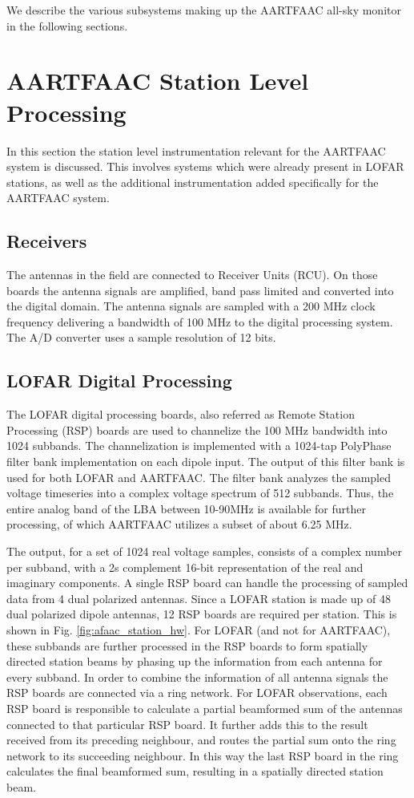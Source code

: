 \documentclass{ws-jai}
\begin{document}
We describe the various subsystems making up the AARTFAAC all-sky monitor in the
following sections.

\section {\label{sec:station_hardware} AARTFAAC Station Level Processing}
In  this section  the station  level instrumentation  relevant for  the AARTFAAC
system is discussed.  This involves systems which were already  present in LOFAR
stations, as well  as the additional instrumentation added  specifically for the
AARTFAAC system.
\subsection {Receivers}  The  antennas  in the  field  are connected  to
Receiver Units  (RCU). On those boards  the antenna signals are  amplified, band
pass limited  and converted into  the digital  domain.  The antenna  signals are
sampled with a 200 MHz clock frequency  delivering a bandwidth of 100 MHz to the
digital processing  system. The  A/D converter  uses a  sample resolution  of 12
bits.

\subsection  {LOFAR Digital  Processing}  The  LOFAR digital  processing
boards, also  referred as  Remote Station  Processing (RSP)  boards are  used to
channelize  the 100  MHz bandwidth  into 1024  subbands.  The  channelization is
implemented with a 1024-tap PolyPhase  filter bank implementation on each dipole
input. The output of  this filter bank is used for both  LOFAR and AARTFAAC. The
filter  bank analyzes  the sampled  voltage  timeseries into  a complex  voltage
spectrum  of 512  subbands. Thus,  the  entire analog  band of  the LBA  between
10-90MHz  is available  for further  processing,  of which  AARTFAAC utilizes  a
subset of about 6.25 MHz.

The output, for a set of 1024 real voltage samples, consists of a complex number
per  subband,  with a  2s  complement  16-bit  representation  of the  real  and
imaginary components.  A  single RSP board can handle the  processing of sampled
data from 4 dual polarized antennas. Since a LOFAR station is made up of 48 dual
polarized dipole antennas, 12 RSP boards are required per station. This is shown
in Fig.   \ref{fig:afaac_station_hw}.  For LOFAR  (and not for  AARTFAAC), these
subbands are  further processed  in the  RSP boards  to form  spatially directed
station  beams  by phasing  up  the  information  from  each antenna  for  every
subband. In  order to  combine the  information of all  antenna signals  the RSP
boards are connected via a ring  network. For LOFAR observations, each RSP board
is responsible to  calculate a partial beamformed sum of  the antennas connected
to that particular RSP board.  It further  adds this to the result received from
its preceding neighbour, and routes the partial sum onto the ring network to its
succeeding neighbour.  In this way the last RSP board in the ring calculates the
final beamformed sum, resulting in a spatially directed station beam.
\end{document}
